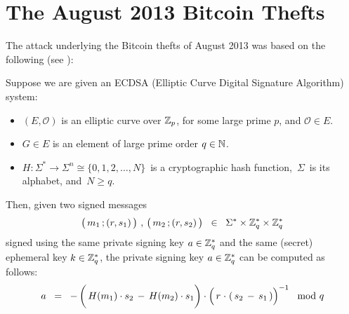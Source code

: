 
\section{The August 2013 Bitcoin Thefts}
\setcounter{theorem}{0}
\setcounter{equation}{0}


The attack underlying the Bitcoin thefts of August 2013 was based
on the following (see \cite{Schneider20130128}):
\begin{proposition}
\mbox{}
\vskip 0.1cm
\noindent
Suppose we are given an ECDSA (Elliptic Curve Digital Signature Algorithm) system:
\begin{itemize}
\item
	$(E,\mathcal{O})$ is an elliptic curve over $\mathbb{Z}_{p}$, for some large prime $p$,
	and $\mathcal{O} \in E$.
\item
	$G \in E$ is an element of large prime order $q \in \mathbb{N}$.
\item
	$H : \Sigma^{*} \longrightarrow \Sigma^{n} \cong \{0,1,2,\ldots,N\}$\,
	is a cryptographic hash function,
	\,$\Sigma$\, is its alphabet, and \,$N \geq q$.
\end{itemize}
Then, given two signed messages
\begin{equation*}
\left(\,m_{1}\,\overset{{\color{white}.}}{;}\,(r,s_{1})\,\right)
\,,\,
\left(\,m_{2}\,\overset{{\color{white}.}}{;}\,(r,s_{2})\,\right)
\;\; \in \;\;
	\Sigma^{*} \times \Z_{q}^{*} \times \Z_{q}^{*}
\end{equation*}
signed using the same
private signing key $a \in \mathbb{Z}_{q}^{*}$ and the same (secret) ephemeral key $k \in \mathbb{Z}_{q}^{*}$,
the private signing key $a \in \mathbb{Z}_{q}^{*}$ can be computed as follows:
\begin{equation*}
a
\;\;=\;\;
	- \left(\,H(m_{1}) \cdot s_{2} \, \overset{{\color{white}1}}{-} \, H(m_{2}) \cdot s_{1} \right)
	\cdot
	\left(\,r \overset{{\color{white}1}}{\cdot} \left(\, s_{2} \,-\, s_{1} \,\right)\right)^{-1}
	 \mod q
\end{equation*}
\end{proposition}

\proof


